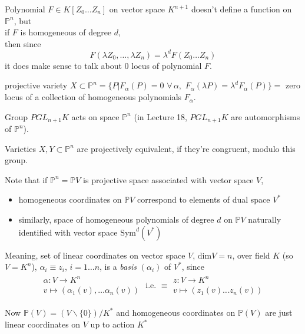 Polynomial $F \in K[Z_0 \dots Z_n]$ on vector space $K^{n+1}$ doesn't define a function on $\mathbb{P}^n$, but \\
if $F$ is homogeneous of degree $d$, \\
\phantom{if }then since 
\[
	F(\lambda Z_0 , \dots , \lambda Z_n) = \lambda^d F(Z_0 \dots Z_n)
\]
it does make sense to talk about $0$ locus of polynomial $F$.

\begin{definition}
	projective variety $X \subset \mathbb{P}^n = \lbrace P | F_{\alpha}(P) = 0 \, \, \forall \, \alpha, \, \, F_{\alpha}(\lambda P) = \lambda^d F_{\alpha}(P) \rbrace = $ zero locus of a collection of homogeneous polynomials $F_{\alpha}$. 
\end{definition}

Group $PGL_{n+1}K$ acts on space $\mathbb{P}^n$ (in Lecture 18, $PGL_{n+1}K$ are automorphisms of $\mathbb{P}^n$).

Varieties $X, Y \subset \mathbb{P}^n$ are projectively equivalent, if they're congruent, modulo this group.

Note that if $\mathbb{P}^n = \mathbb{P}V$ is projective space associated with vector space $V$, \\
\begin{itemize}
	\item homogeneous coordinates on $\mathbb{P}V$ correspond to elements of dual space $V^*$ 
	\item similarly, space of homogeneous polynomials of degree $d$ on $\mathbb{P}V$ naturally identified with vector space $\text{Sym}^d(V^*)$
\end{itemize}
Meaning, set of linear coordinates on vector space $V$, $\text{dim}V = n$, over field $K$ (so $V= K^n$), $\alpha_i \equiv z_i$, $i=1 \dots n$, is a \emph{basis} $(\alpha_i)$ of $V^*$, since 
\[
\begin{gathered}
	\begin{gathered}
	\alpha : V \to K^n \\
	v \mapsto (\alpha_1(v) , \dots \alpha_n(v)) 
	\end{gathered} \text{ i.e. } \equiv \begin{gathered}
	z : V \to K^n \\
	v \mapsto (z_1(v) \dots z_n(v))
	\end{gathered}
\end{gathered}
\]

Now $\mathbb{P}(V) = (V \backslash \lbrace 0 \rbrace ) / K^*$ and homogeneous coordinates on $\mathbb{P}(V)$ are just linear coordinates on $V$ up to action $K^*$

